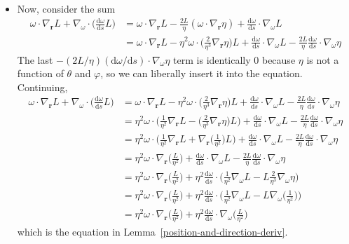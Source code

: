 \documentclass[10pt]{article}
\newcommand{\dee}{\mathrm{d}}
\newcommand{\ve}[1]{\mathbf{#1}}
\begin{document}
\begin{itemize}
    \item Now, consider the sum
    \begin{align*}
      \omega \cdot \nabla_{\ve{r}} L + \nabla_{\omega} \cdot \bigg( \frac{\dee \omega}{\dee s} L \bigg)
      &= \omega \cdot \nabla_{\ve{r}} L 
      - \frac{2L}{\eta}(\omega \cdot \nabla_{\ve{r}} \eta)
      + \frac{\dee \omega}{\dee s} \cdot \nabla_{\omega} L \\
      &= \omega \cdot \nabla_{\ve{r}} L 
      - \eta^2 \omega \cdot \bigg( \frac{2}{\eta^3} \nabla_{\ve{r}} \eta \bigg) L
      + \frac{\dee \omega}{\dee s} \cdot \nabla_{\omega} L 
      - \frac{2L}{\eta} \frac{\dee\omega}{\dee s} \cdot \nabla_{\omega}\eta
    \end{align*}
    The last $-(2L/\eta)(\dee \omega /\dee s) \cdot \nabla_\omega \eta$ term is identically $0$ because $\eta$ is not a function of $\theta$ and $\varphi$, so we can liberally insert it into the equation. Continuing,
    \begin{align*}
      \omega \cdot \nabla_{\ve{r}} L + \nabla_{\omega} \cdot \bigg( \frac{\dee \omega}{\dee s} L \bigg)
      &= \omega \cdot \nabla_{\ve{r}} L 
      - \eta^2 \omega \cdot \bigg( \frac{2}{\eta^3} \nabla_{\ve{r}} \eta \bigg) L
      + \frac{\dee \omega}{\dee s} \cdot \nabla_{\omega} L 
      - \frac{2L}{\eta} \frac{\dee\omega}{\dee s} \cdot \nabla_{\omega}\eta \\
      &= \eta^2 \omega \cdot \bigg( \frac{1}{\eta^2} \nabla_{\ve{r}} L 
      - \bigg( \frac{2}{\eta^3} \nabla_{\ve{r}} \eta \bigg) L \bigg)
      + \frac{\dee \omega}{\dee s} \cdot \nabla_{\omega} L 
      - \frac{2L}{\eta} \frac{\dee\omega}{\dee s} \cdot \nabla_{\omega}\eta \\
      &= \eta^2 \omega \cdot \bigg( \frac{1}{\eta^2} \nabla_{\ve{r}} L 
      + \nabla_{\ve{r}}\bigg( \frac{1}{\eta^2} \bigg) L \bigg)
      + \frac{\dee \omega}{\dee s} \cdot \nabla_{\omega} L 
      - \frac{2L}{\eta} \frac{\dee\omega}{\dee s} \cdot \nabla_{\omega}\eta \\      
      &= \eta^2 \omega \cdot \nabla_{\ve{r}} \bigg( \frac{L}{\eta^2} \bigg)
      + \frac{\dee \omega}{\dee s} \cdot \nabla_{\omega} L 
      - \frac{2L}{\eta} \frac{\dee\omega}{\dee s} \cdot \nabla_{\omega}\eta \\ 
      &= \eta^2 \omega \cdot \nabla_{\ve{r}} \bigg( \frac{L}{\eta^2} \bigg)
      + \eta^2 \frac{\dee \omega}{\dee s} \cdot \bigg( \frac{1}{\eta^2} \nabla_{\omega} L 
      - L \frac{2}{\eta^3} \nabla_{\omega}\eta \bigg) \\ 
      &= \eta^2 \omega \cdot \nabla_{\ve{r}} \bigg( \frac{L}{\eta^2} \bigg)
      + \eta^2 \frac{\dee \omega}{\dee s} \cdot \bigg( \frac{1}{\eta^2} \nabla_{\omega} L 
      - L \nabla_{\omega}\bigg( \frac{1}{\eta^2}\bigg) \bigg) \\ 
      &= \eta^2 \omega \cdot \nabla_{\ve{r}} \bigg( \frac{L}{\eta^2} \bigg)
      + \eta^2 \frac{\dee \omega}{\dee s} \cdot \nabla_\omega \bigg( \frac{L}{\eta^2} \bigg)
    \end{align*}
    which is the equation in Lemma~\ref{position-and-direction-deriv}.    
  \end{itemize}
\end{document}

